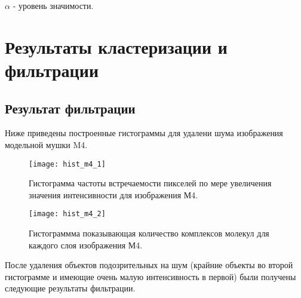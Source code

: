 $\alpha$ - уровень значимости.



\section{Результаты кластеризации и фильтрации} \label{ch4:sec2}

\subsection{Результат фильтрации}
Ниже приведены построенные гистограммы для удалени шума изображения модельной мушки M4.

\begin{figure}[H]
	\centering
	\texttt{[image: hist\_m4\_1]}
	\caption{Гистограмма частоты встречаемости пикселей по мере увеличения значения интенсивности для изображения М4.}
	\label{hist_m4_1}
\end{figure}

\begin{figure}[H]
	\centering
	\texttt{[image: hist\_m4\_2]}
	\caption{Гистограммма показывающая количество комплексов молекул для каждого слоя изображения М4.}
	\label{hist_m4_2}
\end{figure}

После удаления объектов подозрительных на шум (крайние объекты во второй гистограмме и имеющие очень малую интенсивность в первой) были получены следующие результаты фильтрации.


